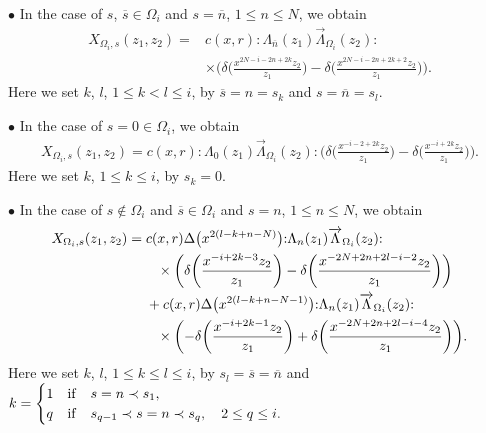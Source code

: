 \documentclass[10pt,a4paper]{amsart}
\numberwithin{equation}{section}
\begin{document}
\noindent
$\bullet$
In the case of $s$, $\overline{s} \in \Omega_i$ and $s=\overline{n}$,
$1\leq n \leq N$, we obtain
\begin{align}
X_{\Omega_i,s}(z_1,z_2)={}&
c(x,r){:}\Lambda_{\overline{n}}(z_1)\overrightarrow{\Lambda}_{\Omega_i}(z_2){:}\nonumber
\\
&\times\bigg(\delta\bigg(\frac{x^{2N-i-2n+2k}z_2}{z_1}\bigg)-
\delta\bigg(\frac{x^{2N-i-2n+2k+2} z_2}{z_1}\bigg)\bigg).
\label{exchange:L4}
\end{align}
Here we set $k$, $l$, $1\leq k<l \leq i$,
by $\overline{s}=n=s_k$ and $s=\overline{n}=s_l$.

\noindent
$\bullet$
In the case of $s=0 \in \Omega_i$, we obtain
\begin{gather}
{X_{\Omega_i,s}(z_1,z_2)}=
c(x,r){:}\Lambda_{0}(z_1)\overrightarrow{\Lambda}_{\Omega_i}(z_2){:}
\bigg(\delta\bigg(\frac{x^{-i-2+2k}z_2}{z_1}\bigg)-
\delta\bigg(\frac{x^{-i+2k} z_2}{z_1}\bigg)\bigg).
\label{exchange:L5}
\end{gather}
Here we set $k$, $1\leq k \leq i$, by $s_k=0$.

\noindent
$\bullet$
In the case of $s \notin \Omega_i$ and $ \overline{s} \in \Omega_i$
and $s=n$, $1\leq n \leq N$, we obtain
\begin{align}
X_{\Omega_i,s}(z_1,z_2)={}&c(x,r)\Delta\big(x^{2(l-k+n-N)}\big)
{:}\Lambda_{n}(z_1)\overrightarrow{\Lambda}_{\Omega_i}(z_2){:}\notag
\\
&\phantom{+}\times\bigg(\delta\bigg(\frac{x^{-i+2k-3}z_2}{z_1}\bigg)-
\delta\bigg(\frac{x^{-2N+2n+2l-i-2} z_2}{z_1}\bigg)\bigg)
\notag
\\
&+c(x,r)\Delta\big(x^{2(l-k+n-N-1)}\big)
{:}\Lambda_{n}(z_1)\overrightarrow{\Lambda}_{\Omega_i}(z_2){:}\notag
\\
&\phantom{+}\times\bigg({-}\delta\bigg(\frac{x^{-i+2k-1}z_2}{z_1}\bigg)+
\delta\bigg(\frac{x^{-2N+2n+2l-i-4} z_2}{z_1}\bigg)\bigg).
\label{exchange:L6}
\end{align}
Here we set $k$, $l$, $1 \leq k \leq l \leq i$, by $s_l=\overline{s}=\overline{n}$ and
$k=\begin{cases}
1&{\rm if}\quad s=n\prec s_1,\\
q&{\rm if}\quad s_{q-1}\prec s=n \prec s_q,\quad 2 \leq q \leq i.
\end{cases}$
\end{document}
